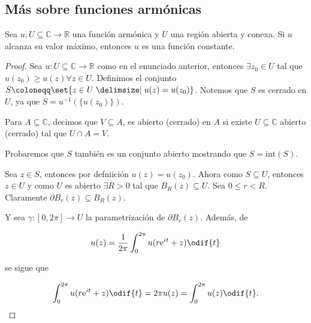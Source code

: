 \documentclass[../main.tex]{subfiles}
\begin{document}
\subsection{Más sobre funciones armónicas}

\begin{theorem}\label{thm:ppmarmonicas}
    Sea \(u \colon U \subseteq \mathbb{C} \to \mathbb{R}\) una función
    armónica y \(U\) una región abierta y
    conexa. Si \(u\) alcanza su valor máximo, entonces \(u\) es una función constante.
\end{theorem}

\begin{proof}
    Sea \(u \colon U \subseteq \mathbb{C} \to \mathbb{R}\) como en el enunciado
    anterior, entonces \(\exists z_{0}\in U\) tal que \(u(z_{0}) \geq u(z) \forall z\in
    U\). Definimos el conjunto \(S \coloneqq \set{z\in U  \given u(z) = u(z_{0})}\).
    Notemos que \(S\) es cerrado en \(U\), ya que \(S = u^{-1}(\{u(z_{0})\})\).

    \begin{remark}
        Para \(A \subseteq \mathbb{C}\), decimos que \(V \subseteq A\), es
        abierto (cerrado)
        en \(A\) si existe \(U \subseteq \mathbb{C}\) abierto (cerrado) tal
        que \(U \cap A =
        V\).
    \end{remark}

    Probaremos que \(S\) también es un conjunto abierto mostrando que \(S =
    \mathrm{int}(S)\).

    Sea \(z\in S\), entonces por defniición \(u(z) = u(z_{0})\). Ahora como
    \(S \subseteq
    U\), entonces \(z\in U\) y como \(U\) es abierto \(\exists R > 0\) tal
    que \(B_{R}(z)
    \subseteq U\). Sea \(0 \leq r < R\). Claramente \(\partial B_{r}(z) \subseteq
    B_{R}(z)\).

    Y sea \(\gamma \colon [0, 2\pi] \to U\) la parametrización de \(\partial B_{r}(z)\).
    Además, de

    \begin{equation*}
        u(z) = \dfrac{1}{2\pi}\int_{0}^{2\pi}u(r \mathrm{e}^{it} + z)\odif{t}
    \end{equation*}

    se sigue que

    \begin{equation*}
        \int_{0}^{2\pi}u(r \mathrm{e}^{it} + z)\odif{t} = 2\pi u(z) =
        \int_{0}^{2\pi}u(z)\odif{t}.
    \end{equation*}


\end{proof}
\end{document}
